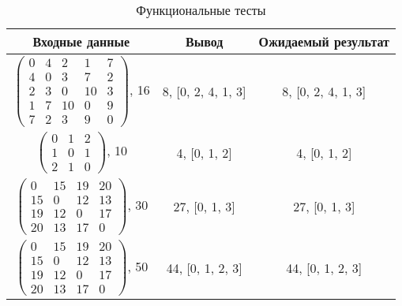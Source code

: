 \begin{table}[h!]
	\begin{center}
        \caption{\label{tab:test}Функциональные тесты}
        \begin{tabular}{|c|c|c|}
			\hline
            \textbf{Входные данные} & \textbf{Вывод} &\textbf{Ожидаемый
            результат} \\ [2mm]
            \hline
            $ \begin{pmatrix}
                0 &  4 &  2 &  1 & 7 \\
                4 &  0 &  3 &  7 & 2 \\
                2 &  3 &  0 & 10 & 3 \\
                1 &  7 & 10 &  0 & 9 \\
                7 &  2 &  3 &  9 & 0
            \end{pmatrix}$, 16 &
                8, [0, 2, 4, 1, 3] &
                8, [0, 2, 4, 1, 3] \\

            $ \begin{pmatrix}
                    0 & 1 & 2 \\
                    1 & 0 & 1 \\
                    2 & 1 & 0	
            \end{pmatrix}$, 10 &
                4, [0, 1, 2] &
                4, [0, 1, 2] \\

            $ \begin{pmatrix}
                0 & 15 & 19 & 20 \\
                15 &  0 & 12 & 13 \\
                19 & 12 &  0 & 17 \\
                20 & 13 & 17 &  0
            \end{pmatrix}$, 30 &
                27, [0, 1, 3] &
                27, [0, 1, 3] \\

            $ \begin{pmatrix}
                0 & 15 & 19 & 20 \\
                15 &  0 & 12 & 13 \\
                19 & 12 &  0 & 17 \\
                20 & 13 & 17 &  0
            \end{pmatrix}$, 50 &
                44, [0, 1, 2, 3] &
                44, [0, 1, 2, 3] \\
            \hline 
		\end{tabular}
	\end{center}
\end{table}


